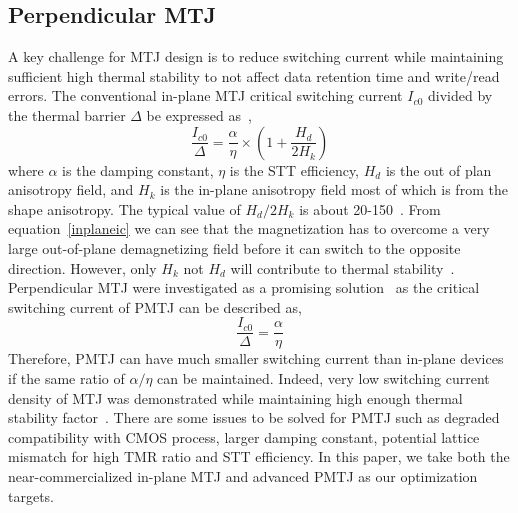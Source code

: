 \subsection{Perpendicular MTJ}
A key challenge for MTJ design is to reduce switching current while maintaining sufficient high thermal stability to not affect data retention time and write/read errors. The conventional in-plane MTJ critical switching current $I_{c0}$ divided by the thermal barrier $\Delta$ be expressed as~\cite{PMTJ:Grandis10},
\begin{equation}
\frac{I_{c0}}{\Delta} = \frac{\alpha}{\eta} \times (1+\frac{H_{d}}{2H_{k}})
\label{inplaneic}
\end{equation}
where $\alpha$ is the damping constant, $\eta$ is the STT efficiency, $H_{d}$ is the out of plan anisotropy field, and $H_{k}$ is the in-plane anisotropy field most of which is from the shape anisotropy. The typical value of $H_{d}/2H_{k}$ is about 20-150~\cite{STTRAM:Review10A}. From equation~\ref{inplaneic} we can see that the magnetization has to overcome a very large out-of-plane demagnetizing field before it can switch to the opposite direction. However, only $H_{k}$ not $H_{d}$ will contribute to thermal stability~\cite{PMTJ:Grandis10}. Perpendicular MTJ were investigated as a promising solution~\cite{PMTJ:APL06,PMTJ:Grandis10,PMTJ:Toshiba08,PMTJ:Xiaochun06} as the critical switching current of PMTJ can be described as,
\begin{equation}
\frac{I_{c0}}{\Delta} = \frac{\alpha}{\eta} 
\label{PMTJic}
\end{equation}
Therefore, PMTJ can have much smaller switching current than in-plane devices if the same ratio of $\alpha / \eta$ can be maintained. Indeed, very low switching current density of MTJ was demonstrated while maintaining high enough thermal stability factor~\cite{PMTJ:Toshiba08}. There are some issues to be solved for PMTJ such as degraded compatibility with CMOS process, larger damping constant, potential lattice mismatch for high TMR ratio and STT efficiency. In this paper, we take both the near-commercialized in-plane MTJ and advanced PMTJ as our optimization targets.







